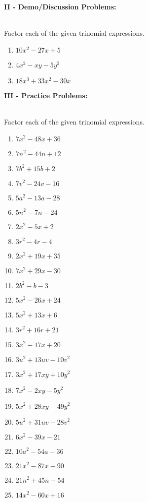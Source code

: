 \documentclass[12pt]{article}
\theoremstyle{definition}
\begin{document}
{\bf II - Demo/Discussion Problems:}\\
\ \par
Factor each of the given trinomial expressions.
\begin{multicols}{3}
\begin{enumerate}
	\item $10x^2-27x+5$
	\item $4x^2-xy-5y^2$
	\item $18x^3+33x^2-30x$
\end{enumerate}
\end{multicols}
{\bf III - Practice Problems:}\\
\ \par
Factor each of the given trinomial expressions.
\begin{multicols}{3}
  \begin{enumerate}
  \item $7 x^2 - 48 x + 36$
  \item $7 n^2 - 44 n + 12$
  \item $7 b^2 + 15 b + 2$
  \item $7 v^2 - 24 v - 16$
  \item $5 a^2 - 13 a - 28$
  \item $5 n^2 - 7 n - 24$
  \item $2 x^2 - 5 x + 2$
  \item $3 r^2 - 4 r - 4$
  \item $2 x^2 + 19 x + 35$
  \item $7 x^2 + 29 x - 30$
  \item $2 b^2 - b - 3$
  \item $5 x^2 - 26 x + 24$
  \item $5 x^2 + 13 x + 6$
  \item $3 r^2 + 16 r + 21$
  \item $3 x^2 - 17 x + 20$
  \item $3 u^2 + 13 u v - 10 v^2$
  \item $3 x^2 + 17 x y + 10 y^2$
  \item $7 x^2 - 2 x y - 5 y^2$
  \item $5 x^2 + 28 x y - 49 y^2$
  \item $5 u^2 + 31 u v - 28 v^2$
  \item $6 x^2 - 39 x - 21$
  \item $10 a^2 - 54 a - 36$
  \item $21 x^2 - 87 x - 90$
  \item $21 n^2 + 45 n - 54$
  \item $14 x^2 - 60 x + 16$

\end{enumerate}
\end{multicols}
\end{document}
